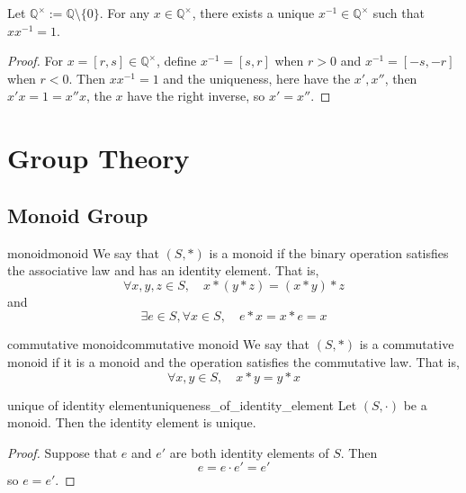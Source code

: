 \documentclass[11pt,lang=en]{elegantbook}
\begin{document}
\begin{proposition}
  Let $\mathbb{Q}^{\times} := \mathbb{Q} \setminus \{0\}$. For any $x \in \mathbb{Q}^{\times}$, there exists a unique $x^{-1} \in \mathbb{Q}^{\times}$ such that $xx^{-1} = 1$.
\end{proposition}

\begin{proof}
  For $x = [r,s] \in \mathbb{Q}^{\times}$, define $x^{-1} = [s,r]$ when $r > 0$ and $x^{-1} = [-s,-r]$ when $r < 0$. 
  Then $xx^{-1} = 1$ and the uniqueness, here have the $x',x''$, then $x'x=1=x''x$, the $x$ have the right inverse, so $x'=x''$.
\end{proof}





\chapter{Group Theory}


\section{Monoid Group}

\begin{definition}{monoid}{monoid}
  We say that $(S, \ast)$ is a monoid if the binary operation satisfies the associative law and has an identity element. That is,
  \[
  \forall x, y, z \in S, \quad x \ast (y \ast z) = (x \ast y) \ast z
  \]
  and
  \[
  \exists e \in S, \forall x \in S, \quad e \ast x = x \ast e = x
  \]
\end{definition}


\begin{definition}{commutative monoid}{commutative monoid}
  We say that $(S, \ast)$ is a commutative monoid if it is a monoid and the operation satisfies the commutative law. That is,
  \[
  \forall x, y \in S, \quad x \ast y = y \ast x
  \]
\end{definition}

\begin{proposition}{unique of identity element}{uniqueness_of_identity_element}
  Let $(S, \cdot)$ be a monoid. Then the identity element is unique.
\end{proposition}
\begin{proof}
  Suppose that $e$ and $e'$ are both identity elements of $S$. Then
  \[
  e = e \cdot e' = e'
  \]
  so $e = e'$.
\end{proof}
\end{document}
